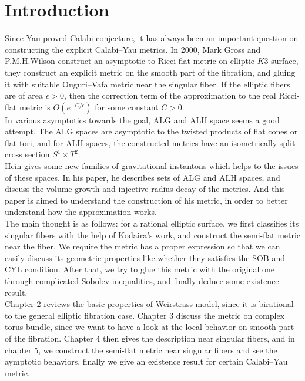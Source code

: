
\chapter{Introduction}
Since Yau proved\cite{yau1978ricci} Calabi conjecture, it has always been an important question on constructing the explicit Calabi--Yau metrics. In 2000, Mark Gross and P.M.H.Wilson construct\cite{gross2000large} an asymptotic to Ricci-flat metric on elliptic $K3$ surface, they construct an explicit metric on the smooth part of the fibration, and gluing it with suitable Ouguri--Vafa metric\cite{ooguri1996summing} near the singular fiber. If the elliptic fibers are of area $\epsilon>0$, then the correction term of the approximation to the real Ricci-flat metric is $O(e^{-C/\epsilon})$ for some constant $C>0$.\\ \indent
In various asymptotics towards the goal, ALG and ALH space seems a good attempt. The ALG spaces are asymptotic to the twisted products of flat cones or flat tori, and for ALH spaces, the constructed metrics have an isometrically split cross section $S^1\times T^2$.\\ \indent
Hein gives\cite{hein2012gravitational} some new families of gravitational instantons which helps to the issues of these spaces. In his paper, he describes sets of ALG and ALH spaces, and discuss the volume growth and injective radius decay of the metrics. And this paper is aimed to understand the construction of his metric, in order to better understand how the approximation works.\\ \indent
The main thought is as follows: for a rational elliptic surface, we first classifies its singular fibers with the help of Kodaira's work, and construct the semi-flat metric near the fiber. We require the metric has a proper expression so that we can easily discuss its geometric properties like whether they satisfies the SOB and CYL condition. After that, we try to glue this metric with the original one through complicated Sobolev inequalities, and finally deduce some existence result.\\ \indent
Chapter 2 reviews the basic properties of Weirstrass model, since it is birational to the general elliptic fibration case. Chapter 3 discuss the metric on complex torus bundle, since we want to have a look at the  local behavior on smooth part of the fibration. Chapter 4 then gives the description near singular fibers, and in chapter 5, we construct the semi-flat metric near singular fibers and see the aymptotic behaviors, finally we give an existence result for certain Calabi--Yau metric.


